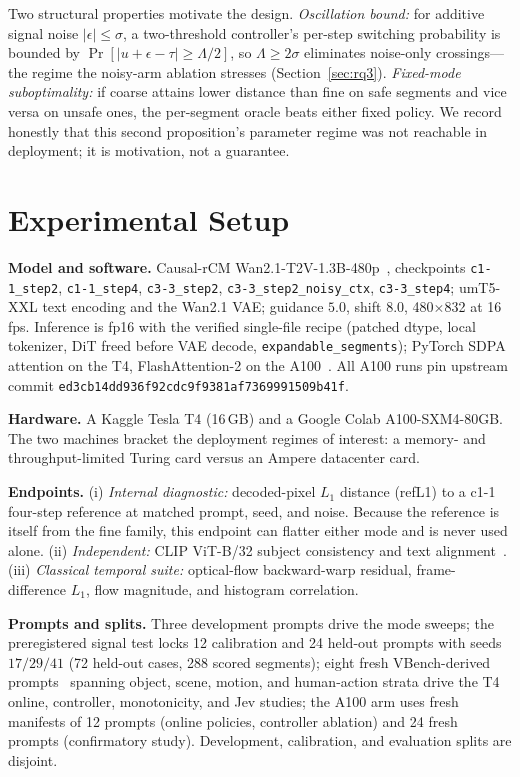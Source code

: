 \documentclass[journal]{IEEEtran}
\newcommand{\cfine}{\textup{c1-1}}
\begin{document}
Two structural properties motivate the design. \emph{Oscillation bound:} for additive signal noise $|\epsilon| \le \sigma$, a two-threshold controller's per-step switching probability is bounded by $\Pr[|u + \epsilon - \tau| \ge \Lambda/2]$, so $\Lambda \ge 2\sigma$ eliminates noise-only crossings---the regime the noisy-arm ablation stresses (Section~\ref{sec:rq3}). \emph{Fixed-mode suboptimality:} if coarse attains lower distance than fine on safe segments and vice versa on unsafe ones, the per-segment oracle beats either fixed policy. We record honestly that this second proposition's parameter regime was not reachable in deployment; it is motivation, not a guarantee.

\section{Experimental Setup}
\label{sec:setup}

\textbf{Model and software.} Causal-rCM Wan2.1-T2V-1.3B-480p~\cite{zhengCausalrCMUnifiedTeacherForcing2026,wan2025wan}, checkpoints \texttt{c1-1\_step2}, \texttt{c1-1\_step4}, \texttt{c3-3\_step2}, \texttt{c3-3\_step2\_noisy\_ctx}, \texttt{c3-3\_step4}; umT5-XXL text encoding and the Wan2.1 VAE; guidance $5.0$, shift $8.0$, 480$\times$832 at 16\,fps. Inference is fp16 with the verified single-file recipe (patched dtype, local tokenizer, DiT freed before VAE decode, \texttt{expandable\_segments}); PyTorch SDPA attention on the T4, FlashAttention-2 on the A100~\cite{dao2022flashattention}. All A100 runs pin upstream commit \texttt{ed3cb14dd936f92cdc9f9381af7369991509b41f}.

\textbf{Hardware.} A Kaggle Tesla T4 (16\,GB) and a Google Colab A100-SXM4-80GB. The two machines bracket the deployment regimes of interest: a memory- and throughput-limited Turing card versus an Ampere datacenter card.

\textbf{Endpoints.} (i) \emph{Internal diagnostic:} decoded-pixel $L_1$ distance (refL1) to a \cfine{} four-step reference at matched prompt, seed, and noise. Because the reference is itself from the fine family, this endpoint can flatter either mode and is never used alone. (ii) \emph{Independent:} CLIP ViT-B/32 subject consistency and text alignment~\cite{radford2021clip,huang2024vbench}. (iii) \emph{Classical temporal suite:} optical-flow backward-warp residual, frame-difference $L_1$, flow magnitude, and histogram correlation.

\textbf{Prompts and splits.} Three development prompts drive the mode sweeps; the preregistered signal test locks 12 calibration and 24 held-out prompts with seeds $17/29/41$ (72 held-out cases, 288 scored segments); eight fresh VBench-derived prompts~\cite{huang2024vbench} spanning object, scene, motion, and human-action strata drive the T4 online, controller, monotonicity, and Jev studies; the A100 arm uses fresh manifests of 12 prompts (online policies, controller ablation) and 24 fresh prompts (confirmatory study). Development, calibration, and evaluation splits are disjoint.
\end{document}
